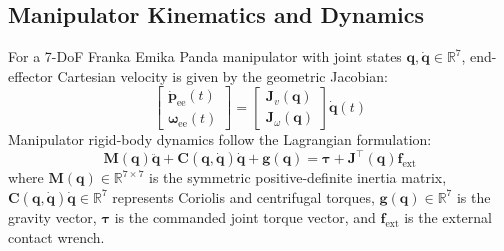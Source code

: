\documentclass[conference]{IEEEtran}
\begin{document}
\subsection{Manipulator Kinematics and Dynamics}
For a 7-DoF Franka Emika Panda manipulator with joint states $\mathbf{q}, \dot{\mathbf{q}} \in \mathbb{R}^7$, end-effector Cartesian velocity is given by the geometric Jacobian:
\begin{equation}
\begin{bmatrix} \dot{\mathbf{p}}_{\text{ee}}(t) \\ \boldsymbol{\omega}_{\text{ee}}(t) \end{bmatrix} = \begin{bmatrix} \mathbf{J}_v(\mathbf{q}) \\ \mathbf{J}_\omega(\mathbf{q}) \end{bmatrix} \dot{\mathbf{q}}(t)
\label{eq:jacobian}
\end{equation}
Manipulator rigid-body dynamics follow the Lagrangian formulation:
\begin{equation}
\mathbf{M}(\mathbf{q})\ddot{\mathbf{q}} + \mathbf{C}(\mathbf{q}, \dot{\mathbf{q}})\dot{\mathbf{q}} + \mathbf{g}(\mathbf{q}) = \boldsymbol{\tau} + \mathbf{J}^\top(\mathbf{q})\mathbf{f}_{\text{ext}}
\label{eq:dynamics}
\end{equation}
where $\mathbf{M}(\mathbf{q}) \in \mathbb{R}^{7 \times 7}$ is the symmetric positive-definite inertia matrix, $\mathbf{C}(\mathbf{q}, \dot{\mathbf{q}})\dot{\mathbf{q}} \in \mathbb{R}^7$ represents Coriolis and centrifugal torques, $\mathbf{g}(\mathbf{q}) \in \mathbb{R}^7$ is the gravity vector, $\boldsymbol{\tau}$ is the commanded joint torque vector, and $\mathbf{f}_{\text{ext}}$ is the external contact wrench.
\end{document}
